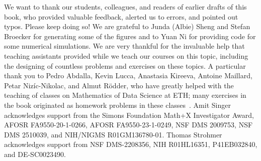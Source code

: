 We want to thank our students, colleagues, and readers of earlier drafts of this book, who provided valuable feedback, alerted us to errors, and pointed out typos. Please keep doing so! We are grateful to Junda (Albie) Sheng and Stefan Broecker for generating some of the figures and to Yuan Ni for providing code for some numerical simulations. We are very thankful for the invaluable help that teaching assistants provided while we teach our courses on this topic, including the designing of countless problems and exercises on these topics. A particular thank you to Pedro Abdalla, Kevin Lucca, Anastasia Kireeva, Antoine Maillard, Petar Niz\'{i}c-Nikolac, and Almut R\"odder, who have greatly helped with the teaching of 
classes on Mathematics of Data Science at ETH; many exercises in the book originated as homework problems in these classes~\cite{ExercisesInMDS2025}. Amit Singer acknowledges support from the Simons Foundation Math+X Investigator Award, AFOSR FA9550-20-1-0266, AFOSR FA9550-23-1-0249, NSF DMS 2009753, NSF DMS 2510039, and NIH/NIGMS R01GM136780-01.
Thomas Strohmer  acknowledges support from NSF DMS-2208356, NIH R01HL16351, P41EB032840, and DE-SC0023490. 

